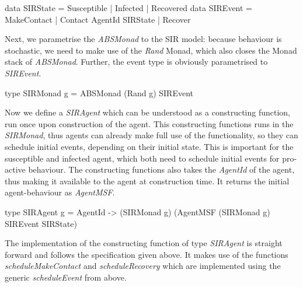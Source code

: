\begin{HaskellCode}
data SIRState = Susceptible | Infected | Recovered
data SIREvent = MakeContact | Contact AgentId SIRState | Recover 
\end{HaskellCode}

Next, we parametrise the \textit{ABSMonad} to the SIR model: because behaviour is stochastic, we need to make use of the \textit{Rand} Monad, which also closes the Monad stack of \textit{ABSMonad}. Further, the event type is obviously parametrised to \textit{SIREvent}.

\begin{HaskellCode}
type SIRMonad g = ABSMonad (Rand g) SIREvent
\end{HaskellCode}

Now we define a \textit{SIRAgent} which can be understood as a constructing function, run once upon construction of the agent. This constructing functions runs in the \textit{SIRMonad}, thus agents can already make full use of the functionality, so they can schedule initial events, depending on their initial state. This is important for the susceptible and infected agent, which both need to schedule initial events for pro-active behaviour. The constructing functions also takes the \textit{AgentId} of the agent, thus making it available to the agent at construction time. It returns the initial agent-behaviour as \textit{AgentMSF}.

\begin{HaskellCode}
type SIRAgent g 
       = AgentId -> (SIRMonad g) (AgentMSF (SIRMonad g) SIREvent SIRState)
\end{HaskellCode}

The implementation of the constructing function of type \textit{SIRAgent} is straight forward and follows the specification given above. It makes use of the functions \textit{scheduleMakeContact} and \textit{scheduleRecovery} which are implemented using the generic \textit{scheduleEvent} from above.

